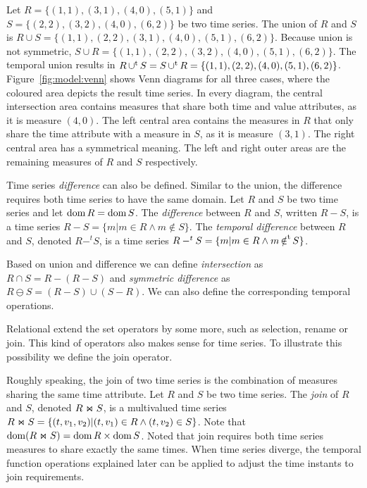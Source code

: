 \begin{example}\label{ex:model:s1s2}
  Let $R=\{(1,1), (3,1), (4,0), (5,1)\}$ and $S=\{(2,2), (3,2), (4,0),
  (6,2)\}$ be two time series. The union of $R$ and $S$ is $R\cup
  S=\{(1,1), (2,2), (3,1), (4,0), (5,1), (6,2)\}$. Because union is
  not symmetric, $S\cup R=\{(1,1), (2,2), \allowbreak(3,2), (4, 0),
  (5,1), (6,2)\}$. The temporal union results in $R\operatorname*{\cup^t} S= S \operatorname*{\cup^t}
  R=\{(1,1), (2,2), (4,0), (5,1), (6,2)\}$.
  Figure~\ref{fig:model:venn} shows Venn diagrams for all three cases,
  where the coloured area depicts the result time series. In every
  diagram, the central intersection area contains measures that share
  both time and value attributes, as it is measure $(4,0)$. The left
  central area contains the measures in $R$ that only share the time
  attribute with a measure in $S$, as it is measure $(3,1)$. The right
  central area has a symmetrical meaning. The left and right outer
  areas are the remaining measures of $R$ and $S$ respectively.
\end{example}

Time series \emph{difference} can also be defined. Similar to the
union, the difference requires both time series to have the same
domain. Let $R$ and $S$ be two time series and let $\operatorname{dom} R = \operatorname{dom}
S$. The \emph{difference} between $R$ and $S$, written $R-S$, is a
time series $R-S=\{m|m\in R\wedge m\notin S\}$. The \emph{temporal
  difference} between $R$ and $S$, denoted $R-^t S$, is a time series
$R-^t S=\{m|m\in R\wedge m \operatorname*{\notin^t} S\}$.

Based on union and difference we can define \emph{intersection} as
$R\cap S = R - (R - S)$ and \emph{symmetric difference} as $R \ominus
S = (R - S) \cup (S - R)$. We can also define the corresponding
temporal operations.

Relational  extend the set operators by some more, such as
selection, rename or join. This kind of operators also makes sense for
time series. To illustrate this possibility we define the join
operator.

Roughly speaking, the join of two time series is the combination of
measures sharing the same time attribute.  Let $R$ and $S$ be two time
series.  The \emph{join} of $R$ and $S$, denoted $R \Join S$, is a
multivalued time series $R \Join S = \{ (t,v_1,v_2) | (t,v_1) \in
R\wedge (t,v_2) \in S\}$. Note that $\operatorname{dom}(R\Join S)=\operatorname{dom} R\times\operatorname{dom}
S$.  Noted that join requires both time series measures to share
exactly the same times. When time series diverge, the temporal
function operations explained later can be applied to adjust the time
instants to join requirements.

